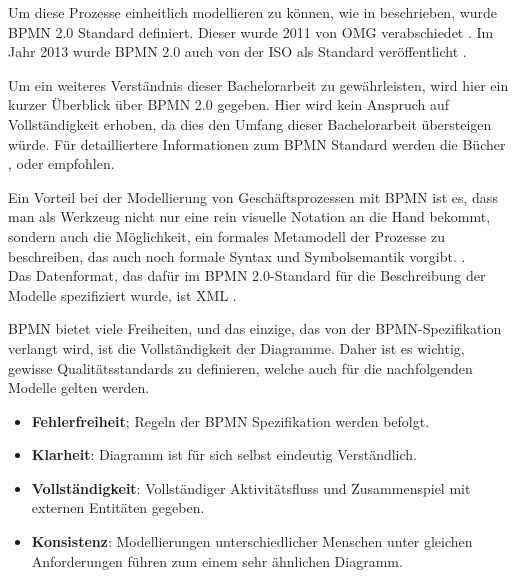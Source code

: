 Um diese Prozesse einheitlich modellieren zu können, wie in  beschrieben, wurde \ac{BPMN} 2.0 Standard definiert. Dieser wurde 2011 von \acl{OMG} verabschiedet \citep[vgl.][S. 8]{freund_praxishandbuch_2017}. Im Jahr 2013 wurde \ac{BPMN} 2.0 auch von der \acl{ISO} als Standard veröffentlicht \citep[vgl.][]{iso_isoiec_2013}.

Um ein weiteres Verständnis dieser Bachelorarbeit zu gewährleisten, wird hier ein kurzer Überblick über \ac{BPMN} 2.0 gegeben. Hier wird kein Anspruch auf Vollständigkeit erhoben, da dies den Umfang dieser Bachelorarbeit übersteigen würde. Für detailliertere Informationen zum \ac{BPMN} Standard werden die Bücher \citep{gopfert_geschaftsprozessmodellierung_2013}, \citep{bruce_bpmn_2012} oder \citep{freund_praxishandbuch_2017} empfohlen.

Ein Vorteil bei der Modellierung von Geschäftsprozessen mit \ac{BPMN} ist es, dass man als Werkzeug nicht nur eine rein visuelle Notation an die Hand bekommt, sondern auch die Möglichkeit, ein formales Metamodell der Prozesse zu beschreiben, das auch noch formale Syntax und Symbolsemantik vorgibt. \citep[vgl.][S. 8]{freund_praxishandbuch_2017}. \\
Das Datenformat, das dafür im \ac{BPMN} 2.0-Standard für die Beschreibung der Modelle spezifiziert wurde, ist \ac{XML} \citep[vgl.][]{object_management_group_about_2010}.

\ac{BPMN} bietet viele Freiheiten, und das einzige, das von der \ac{BPMN}-Spezifikation verlangt wird, ist die Vollständigkeit der Diagramme. Daher ist es wichtig, gewisse Qualitätsstandards zu definieren, welche auch für die nachfolgenden Modelle gelten werden. \citep[vgl.][S. 5]{bruce_bpmn_2012}

\begin{itemize}
    \item \textbf{Fehlerfreiheit}; Regeln der \ac{BPMN} Spezifikation werden befolgt.
    \item \textbf{Klarheit}: Diagramm ist für sich selbst eindeutig Verständlich. \label{enu:item:qualitatsstandards:klarheit}
    \item \textbf{Vollständigkeit}: Vollständiger Aktivitätsfluss und Zusammenspiel mit externen Entitäten gegeben.
    \item \textbf{Konsistenz}: Modellierungen unterschiedlicher Menschen unter gleichen Anforderungen führen zum einem sehr ähnlichen Diagramm.
\end{itemize}
\citep[vgl.][S. 5]{bruce_bpmn_2012}

